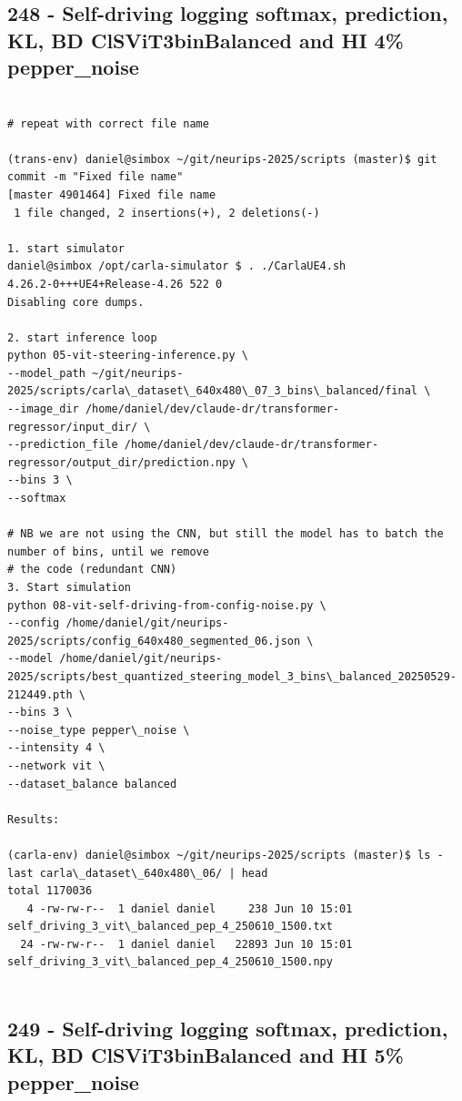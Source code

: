 \subsection{248 - Self-driving logging softmax, prediction, KL, BD ClSViT3binBalanced and HI 4\% pepper\_noise}
\label{app_res:248}
\begin{verbatim}

# repeat with correct file name

(trans-env) daniel@simbox ~/git/neurips-2025/scripts (master)$ git commit -m "Fixed file name"
[master 4901464] Fixed file name
 1 file changed, 2 insertions(+), 2 deletions(-)
 
1. start simulator
daniel@simbox /opt/carla-simulator $ . ./CarlaUE4.sh 
4.26.2-0+++UE4+Release-4.26 522 0
Disabling core dumps.

2. start inference loop
python 05-vit-steering-inference.py \
--model_path ~/git/neurips-2025/scripts/carla\_dataset\_640x480\_07_3_bins\_balanced/final \
--image_dir /home/daniel/dev/claude-dr/transformer-regressor/input_dir/ \
--prediction_file /home/daniel/dev/claude-dr/transformer-regressor/output_dir/prediction.npy \
--bins 3 \
--softmax

# NB we are not using the CNN, but still the model has to batch the number of bins, until we remove
# the code (redundant CNN)
3. Start simulation
python 08-vit-self-driving-from-config-noise.py \
--config /home/daniel/git/neurips-2025/scripts/config_640x480_segmented_06.json \
--model /home/daniel/git/neurips-2025/scripts/best_quantized_steering_model_3_bins\_balanced_20250529-212449.pth \
--bins 3 \
--noise_type pepper\_noise \
--intensity 4 \
--network vit \
--dataset_balance balanced

Results:

(carla-env) daniel@simbox ~/git/neurips-2025/scripts (master)$ ls -last carla\_dataset\_640x480\_06/ | head
total 1170036
   4 -rw-rw-r--  1 daniel daniel     238 Jun 10 15:01 self_driving_3_vit\_balanced_pep_4_250610_1500.txt
  24 -rw-rw-r--  1 daniel daniel   22893 Jun 10 15:01 self_driving_3_vit\_balanced_pep_4_250610_1500.npy


\end{verbatim}

\subsection{249 - Self-driving logging softmax, prediction, KL, BD ClSViT3binBalanced and HI 5\% pepper\_noise}
\label{app_res:249}


